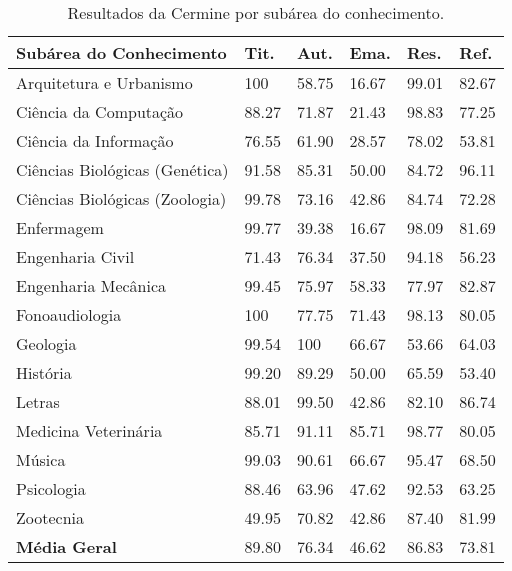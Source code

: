 \begin{table}
    \caption{Resultados da Cermine por subárea do conhecimento.}
    \begin{center}
        \begin{tabular}{|p{6cm}|C{1.2cm}|C{1.2cm}|C{1.2cm}|C{1.2cm}|C{1.2cm}|}
            \hline 
            \textbf{Subárea do Conhecimento} & \textbf{Tit.} & \textbf{Aut.} & \textbf{Ema.} & \textbf{Res.} & \textbf{Ref.} \\ \hline 
            Arquitetura e Urbanismo & 100 & 58.75 & 16.67 & 99.01 & 82.67 \\ \hline  
            Ciência da Computação & 88.27 & 71.87 & 21.43 & 98.83 & 77.25 \\ \hline  
            Ciência da Informação & 76.55 & 61.90 & 28.57 & 78.02 & 53.81 \\ \hline  
            Ciências Biológicas (Genética) & 91.58 & 85.31 & 50.00 & 84.72 & 96.11 \\ \hline  
            Ciências Biológicas (Zoologia) & 99.78 & 73.16 & 42.86 & 84.74 & 72.28 \\ \hline  
            Enfermagem & 99.77 & 39.38 & 16.67 & 98.09 & 81.69 \\ \hline  
            Engenharia Civil & 71.43 & 76.34 & 37.50 & 94.18 & 56.23 \\ \hline  
            Engenharia Mecânica & 99.45 & 75.97 & 58.33 & 77.97 & 82.87 \\ \hline  
            Fonoaudiologia & 100 & 77.75 & 71.43 & 98.13 & 80.05 \\ \hline  
            Geologia & 99.54 & 100 & 66.67 & 53.66 & 64.03 \\ \hline  
            História & 99.20 & 89.29 & 50.00 & 65.59 & 53.40 \\ \hline  
            Letras & 88.01 & 99.50 & 42.86 & 82.10 & 86.74 \\ \hline  
            Medicina Veterinária & 85.71 & 91.11 & 85.71 & 98.77 & 80.05 \\ \hline  
            Música & 99.03 & 90.61 & 66.67 & 95.47 & 68.50 \\ \hline  
            Psicologia & 88.46 & 63.96 & 47.62 & 92.53 & 63.25 \\ \hline  
            Zootecnia & 49.95 & 70.82 & 42.86 & 87.40 & 81.99 \\ \hline  
            \textbf{Média Geral} & 89.80 & 76.34 & 46.62 & 86.83 & 73.81 \\ \hline
        \end{tabular}
    \end{center}
    \label{tab:results-cermine}
\end{table}

